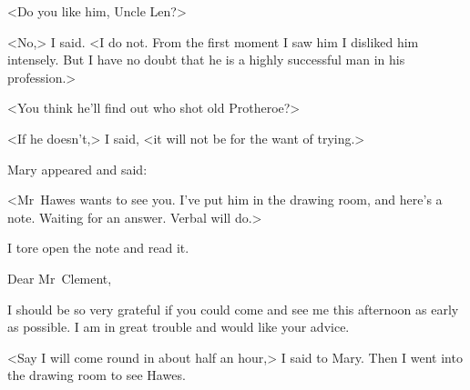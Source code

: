 <Do you like him, Uncle Len?>

<No,> I said. <I do not. From the first moment I saw him I disliked him intensely. But I have no doubt that he is a highly successful man in his profession.>

<You think he'll find out who shot old Protheroe?>

<If he doesn't,> I said, <it will not be for the want of trying.>

Mary appeared and said:

<Mr~Hawes wants to see you. I've put him in the drawing room, and here's a note. Waiting for an answer. Verbal will do.>

I tore open the note and read it.

\begin{mail}{}{Dear Mr~Clement,}

I should be so very grateful if you could come and see me this afternoon as early as possible. I am in great trouble and would like your advice.

\end{mail}

<Say I will come round in about half an hour,> I said to Mary. Then I went into the drawing room to see Hawes.